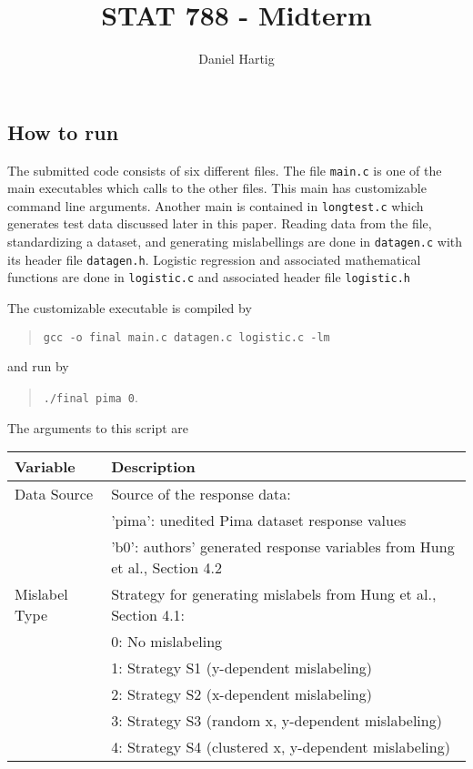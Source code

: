 \documentclass{article}
\title{STAT 788 - Midterm}
\author{Daniel Hartig}
\begin{document}
\maketitle

\subsection*{How to run}

The submitted code consists of six different files. The file \texttt{main.c} is one of the main executables which calls to the other files. This main has customizable command line arguments. Another main is contained in \texttt{longtest.c} which generates test data discussed later in this paper. Reading data from the file, standardizing a dataset, and generating mislabellings are done in \texttt{datagen.c} with its header file \texttt{datagen.h}. Logistic regression and associated mathematical functions are done in \texttt{logistic.c} and associated header file \texttt{logistic.h}

The customizable executable is compiled by 

\begin{quote}\verb!gcc -o final main.c datagen.c logistic.c -lm!\end{quote}

and run by 

\begin{quote}\verb!./final pima 0!.\end{quote}

The arguments to this script are
\begin{center}
\begin{tabular}{ l|l}
\hline
Variable&Description\\
\hline
Data Source& Source of the response data:\\
&'pima': unedited Pima dataset response values\\
&'b0': authors' generated response variables from Hung et al., Section 4.2\\
Mislabel Type&Strategy for generating mislabels from Hung et al., Section 4.1:\\
&0: No mislabeling\\
&1: Strategy S1 (y-dependent mislabeling)\\
&2: Strategy S2 (x-dependent mislabeling)\\
&3: Strategy S3 (random x, y-dependent mislabeling)\\
&4: Strategy S4 (clustered x, y-dependent mislabeling)\\
\end{tabular}
\end{center}
\end{document}
